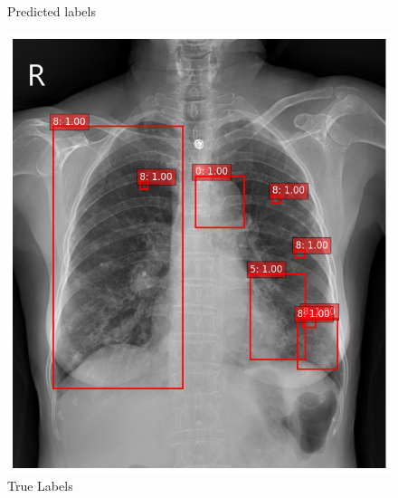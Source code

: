 \documentclass[12pt,oneside]{book} %
\begin{document}
\begin{figure}[H]
\begin{minipage}[b]{0.45\textwidth}
        \caption{Predicted labels}
        \label{fig:predictions_without_filter} %
    \end{minipage}
\end{figure}

\begin{figure}[H]
    \centering
    \begin{minipage}[b]{0.45\textwidth}
        \includegraphics[width=\textwidth]{../results/true_labels.png}
        \caption{True Labels}
        \label{fig:true_labels}
    \end{minipage}
    \hfill %
    \begin{minipage}[b]{0.45\textwidth}

\end{minipage}
\end{figure}
\end{document}
